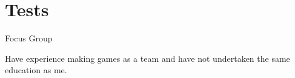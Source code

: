 \section{Tests}
Focus Group

Have experience making games as a team and have not undertaken the same education as me.
